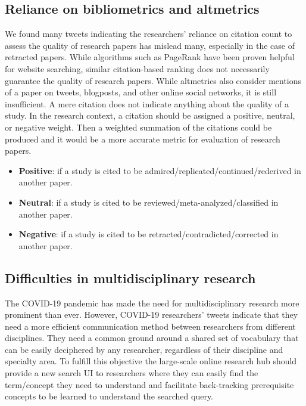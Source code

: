 \documentclass[acmsmall,authordraft]{acmart}
\begin{document}
\subsection{Reliance on bibliometrics and altmetrics}
We found many tweets indicating the researchers’ reliance on citation count to assess the quality of research papers has mislead many, especially in the case of retracted papers. While algorithms such as PageRank \citep{page1999pagerank} have been proven helpful for website searching, similar citation-based ranking does not necessarily guarantee the quality of research papers. While altmetrics also consider mentions of a paper on tweets, blogposts, and other online social networks, it is still insufficient. A mere citation does not indicate anything about the quality of a study. In the research context, a citation should be assigned a positive, neutral, or negative weight. Then a weighted summation of the citations could be produced and it would be a more accurate metric for evaluation of research papers.
\begin{itemize}
   \item \textbf{Positive}: if a study is cited to be admired/replicated/continued/rederived in another paper.
   \item \textbf{Neutral}: if a study is cited to be reviewed/meta-analyzed/classified in another paper.
   \item \textbf{Negative}: if a study is cited to be retracted/contradicted/corrected in another paper.
\end{itemize}

\subsection{Difficulties in multidisciplinary research}
The COVID-19 pandemic has made the need for multidisciplinary research more prominent than ever. However, COVID-19 researchers’ tweets indicate that they need a more efficient communication method between researchers from different disciplines. They need a common ground around a shared set of vocabulary that can be easily deciphered by any researcher, regardless of their discipline and specialty area. To fulfill this objective the large-scale online research hub should provide a new search UI to researchers where they can easily find the term/concept they need to understand and facilitate back-tracking prerequisite concepts to be learned to understand the searched query.
\end{document}
